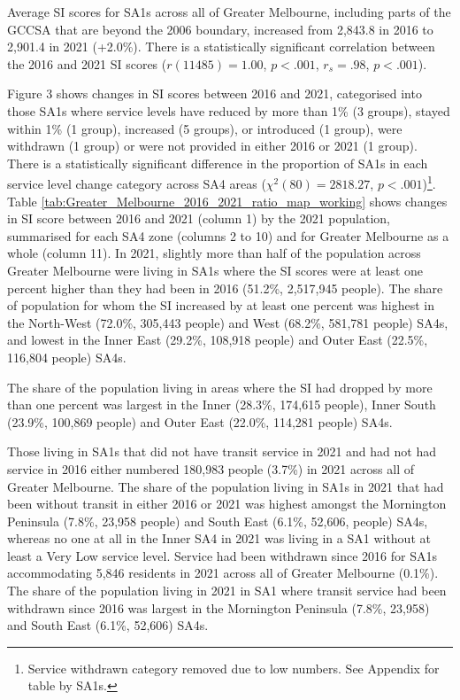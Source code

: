 \documentclass[preprint, 3p,
authoryear]{elsarticle} %
\begin{document}
Average SI scores for SA1s across all of Greater Melbourne, including
parts of the GCCSA that are beyond the 2006 boundary, increased from
2,843.8 in 2016 to 2,901.4 in 2021 (+2.0\%). There is a statistically
significant correlation between the 2016 and 2021 SI scores
(\(r(11485) = 1.00\), \(p < .001\), \(r_s =.98\), \(p < .001\)).

Figure 3 shows changes in SI scores between 2016 and 2021, categorised
into those SA1s where service levels have reduced by more than 1\% (3
groups), stayed within 1\% (1 group), increased (5 groups), or
introduced (1 group), were withdrawn (1 group) or were not provided in
either 2016 or 2021 (1 group). There is a statistically significant
difference in the proportion of SA1s in each service level change
category across SA4 areas (\(\chi^2(80) = 2818.27\),
\(p < .001\))\footnote{Service withdrawn category removed due to low
  numbers. See Appendix for table by SA1s.}. Table
\ref{tab:Greater_Melbourne_2016_2021_ratio_map_working} shows changes in
SI score between 2016 and 2021 (column 1) by the 2021 population,
summarised for each SA4 zone (columns 2 to 10) and for Greater Melbourne
as a whole (column 11). In 2021, slightly more than half of the
population across Greater Melbourne were living in SA1s where the SI
scores were at least one percent higher than they had been in 2016
(51.2\%, 2,517,945 people). The share of population for whom the SI
increased by at least one percent was highest in the North-West (72.0\%,
305,443 people) and West (68.2\%, 581,781 people) SA4s, and lowest in
the Inner East (29.2\%, 108,918 people) and Outer East (22.5\%, 116,804
people) SA4s.

The share of the population living in areas where the SI had dropped by
more than one percent was largest in the Inner (28.3\%, 174,615 people),
Inner South (23.9\%, 100,869 people) and Outer East (22.0\%, 114,281
people) SA4s.

Those living in SA1s that did not have transit service in 2021 and had
not had service in 2016 either numbered 180,983 people (3.7\%) in 2021
across all of Greater Melbourne. The share of the population living in
SA1s in 2021 that had been without transit in either 2016 or 2021 was
highest amongst the Mornington Peninsula (7.8\%, 23,958 people) and
South East (6.1\%, 52,606, people) SA4s, whereas no one at all in the
Inner SA4 in 2021 was living in a SA1 without at least a Very Low
service level. Service had been withdrawn since 2016 for SA1s
accommodating 5,846 residents in 2021 across all of Greater Melbourne
(0.1\%). The share of the population living in 2021 in SA1 where transit
service had been withdrawn since 2016 was largest in the Mornington
Peninsula (7.8\%, 23,958) and South East (6.1\%, 52,606) SA4s.
\end{document}
